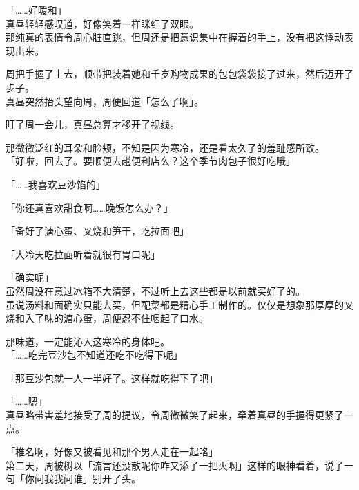 「……好暖和」\\

真昼轻轻感叹道，好像笑着一样眯细了双眼。\\

那纯真的表情令周心脏直跳，但周还是把意识集中在握着的手上，没有把这悸动表现出来。

周把手握了上去，顺带把装着她和千岁购物成果的包包袋袋接了过来，然后迈开了步子。\\

真昼突然抬头望向周，周便回道「怎么了啊」。

盯了周一会儿，真昼总算才移开了视线。

那微微泛红的耳朵和脸颊，不知是因为寒冷，还是看太久了的羞耻感所致。\\

「好啦，回去了。要顺便去趟便利店么？这个季节肉包子很好吃哦」

「……我喜欢豆沙馅的」

「你还真喜欢甜食啊……晚饭怎么办？」

「备好了溏心蛋、叉烧和笋干，吃拉面吧」

「大冷天吃拉面听着就很有胃口呢」

「确实呢」\\

虽然周没在意过冰箱不大清楚，不过听上去这些都是以前就买好了的。\\

虽说汤料和面确实只能去买，但配菜都是精心手工制作的。仅仅是想象那厚厚的叉烧和入了味的溏心蛋，周便忍不住咽起了口水。

那味道，一定能沁入这寒冷的身体吧。\\

「……吃完豆沙包不知道还吃不吃得下呢」

「那豆沙包就一人一半好了。这样就吃得下了吧」

「……嗯」\\

真昼略带害羞地接受了周的提议，令周微微笑了起来，牵着真昼的手握得更紧了一点。\\

\vspace{2\baselineskip}

「椎名啊，好像又被看见和那个男人走在一起咯」\\

第二天，周被树以「流言还没散呢你咋又添了一把火啊」这样的眼神看着，说了一句「你问我我问谁」别开了头。
